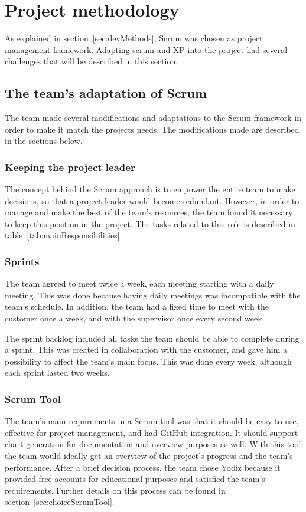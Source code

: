 \newpage
\section{Project methodology}
\label{sec:scrumDevProcess}

As explained in section~\ref{sec:devMethods}, Scrum was chosen as project management framework. Adapting scrum and XP into the project had several challenges that will be described in this section.

\subsection{The team's adaptation of Scrum}
The team made several modifications and adaptations to the Scrum framework in order to make it match the projects needs. The modifications made are described in the sections below.

\subsubsection{Keeping the project leader}
The concept behind the Scrum approach is to empower the entire team to make decisions, so that a project leader would become redundant. However, in order to manage and make the best of the team's resources, the team found it necessary to keep this position in the project. The tasks related to this role is described in table~\ref{tab:mainResponsibilities}.

\subsubsection{Sprints}
The team agreed to meet twice a week, each meeting starting with a daily meeting. This was done because having daily meetings was incompatible with the team's schedule. In addition, the team had a fixed time to meet with the customer once a week, and with the supervisor once every second week.

The sprint backlog included all tasks the team should be able to complete during a sprint. This was created in collaboration with the customer, and gave him a possibility to affect the team's main focus. This was done every week, although each sprint lasted two weeks.

\subsubsection{Scrum Tool}
\label{sec:scrumtool}
The team's main requirements in a Scrum tool was that it should be easy to use, effective for project management, and had GitHub integration. It should support chart generation for documentation and overview purposes as well. With this tool the team would ideally get an overview of the project's progress and the team's performance. After a brief decision process, the team chose Yodiz because it provided free accounts for educational purposes and satisfied the team's requirements. Further details on this process can be found in section~\ref{sec:choiceScrumTool}.

